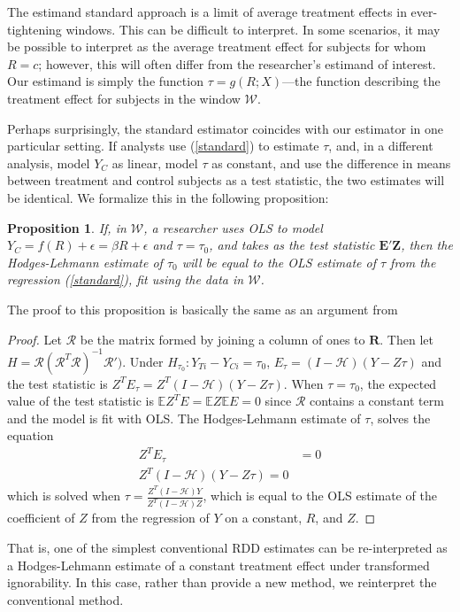 \documentclass[12pt]{article}
\newcommand{\g}{g}
\newcommand{\ych}{E}
\newcommand{\E}{\mathbb{E}}
\newtheorem{prop}{Proposition}
\begin{document}
The estimand standard approach is a limit of average treatment effects in ever-tightening windows.
This can be difficult to interpret.
In some scenarios, it may be possible to interpret as the average treatment effect for subjects for whom $R=c$; however, this will often differ from the researcher's estimand of interest.
Our estimand is simply the function $\tau=\g(R;X)$---the function describing the treatment effect for subjects in the window $\mathcal{W}$.

Perhaps surprisingly, the standard estimator coincides with our estimator in one particular setting.
If analysts use (\ref{standard}) to estimate $\tau$, and, in a different analysis, model $Y_C$ as linear, model $\tau$ as constant, and use the difference in means between treatment and control subjects as a test statistic, the two estimates will be identical.
We formalize this in the following proposition:
\begin{prop}
If, in $\mathcal{W}$, a researcher uses OLS to model $Y_C=f(R)+\epsilon=\beta R +\epsilon$ and $\tau=\tau_0$, and takes as the test statistic $\bm{\ych'Z}$, then the Hodges-Lehmann estimate of $\tau_0$ will be equal to the OLS estimate of $\tau$ from the regression (\ref{standard}), fit using the data in $\mathcal{W}$.
\end{prop}
The proof to this proposition is basically the same as an argument from \citet[][ p. 290]{rosenbaum2002covariance}
\begin{proof}
Let $\mathcal{R}$ be the matrix formed by joining a column of ones to
$\bm{R}$. Then let
$H=\mathcal{R}(\mathcal{R}^T\mathcal{R})^{-1}\mathcal{R}')$. Under $H_{\tau_0}:Y_{Ti}-Y_{Ci}=\tau_0$,
$\ych_{\tau}=(I-\mathcal{H})(Y-Z\tau)$ and the test statistic is
$Z^T\ych_\tau=Z^T(I-\mathcal{H})(Y-Z\tau)$. When $\tau=\tau_0$, the expected value of the
test statistic is $\E Z^T \ych=\E Z\E \ych=0$ since
$\mathcal{R}$ contains a constant term and the model is fit with OLS.
The Hodges-Lehmann estimate of $\tau$, solves the equation
\begin{align}
Z^T\ych_\tau&=0\\
Z^T(I-\mathcal{H})(Y-Z\tau)=0
\end{align}
which is solved when
$\tau=\frac{Z^T(I-\mathcal{H})Y}{Z^T(I-\mathcal{H})Z}$, which is equal
to the OLS estimate of the coefficient of $Z$ from the regression of
$Y$ on a constant, $R$, and $Z$.
\end{proof}
That is, one of the simplest conventional RDD estimates can be
re-interpreted as a Hodges-Lehmann estimate of a constant treatment
effect under transformed ignorability.
In this case, rather than provide a new method, we reinterpret the
conventional method.
\end{document}
